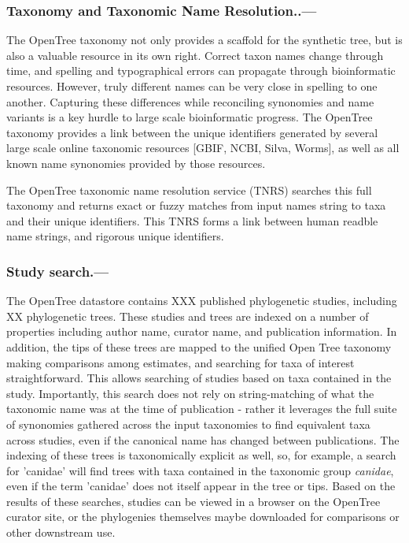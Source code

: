 \documentclass[oupdraft]{sysbio_sse}
\begin{document}
\subsubsection{Taxonomy and Taxonomic Name Resolution..---} The OpenTree taxonomy not only provides a scaffold for the synthetic tree, but is also a valuable resource in its own right.
Correct taxon names change through time, and spelling and typographical errors can propagate through bioinformatic resources. However, truly different names can be very close in spelling to one another. Capturing these differences while reconciling synonomies and name variants is a key hurdle to large scale bioinformatic progress.
The OpenTree taxonomy \citep{rees_automated_2017, opentreeoflife_open_2019b} provides a link between the unique identifiers generated by several large scale online taxonomic resources [GBIF, NCBI, Silva, Worms], as well as all known name synonomies provided by those resources.

The OpenTree taxonomic name resolution service (TNRS) searches this full taxonomy and returns exact or fuzzy matches from input names string to taxa and their unique identifiers.
This TNRS forms a link between human readble name strings, and rigorous unique identifiers.



\subsubsection{Study search.---} The OpenTree datastore contains XXX published phylogenetic studies, including XX phylogenetic trees.
These studies and trees are indexed on a number of properties including author name, curator name, and publication information. 
In addition, the tips of these trees are mapped to the unified Open Tree taxonomy making comparisons among estimates, and searching for taxa of interest straightforward.
This allows searching of studies based on taxa contained in the study.
Importantly, this search does not rely on string-matching of what the taxonomic name was at the time of publication - rather it leverages the full suite of synonomies gathered across the input taxonomies to find equivalent taxa across studies, even if the canonical name has changed between publications.
The indexing of these trees is taxonomically explicit as well, so, for example, a search for 'canidae' will find trees with taxa contained in the taxonomic group \textit{canidae}, even if the term 'canidae' does not itself appear in the tree or tips.
Based on the results of these searches, studies can be viewed in a browser on the OpenTree curator site, or the phylogenies themselves maybe downloaded for comparisons or other downstream use.
\end{document}
